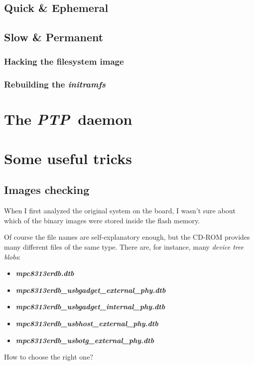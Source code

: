 \documentclass[10pt,a4paper]{article}
\newcommand{\FileName}[1]{\textbf{\textsl{\textsf{{#1}}}}}
\newcommand{\ToolName}[1]{\emph{{#1}}}
\newcommand{\StdName}[1]{\emph{{#1}}}
\newcommand{\InitRamFs}{\ToolName{initramfs}}
\newcommand{\PTP}{\StdName{PTP}}
\begin{document}
        \subsection{ Quick \& Ephemeral }

        \subsection{ Slow \& Permanent }

            \subsubsection{ Hacking the filesystem image }

            \subsubsection{ Rebuilding the \InitRamFs }

    \section{ The \PTP\ daemon }

    \section{ Some useful tricks }

        \subsection{ Images checking }

            When I first analyzed the original system on the board, I
            wasn't sure about which of the binary images were stored
            inside the flash memory.

            Of course the file names are self-explanatory enough, but the
            CD-ROM provides many different files of the same type. There
            are, for instance, many \emph{device tree blobs}:
            \begin{itemize}
                \item \FileName{mpc8313erdb.dtb}
                \item \FileName{mpc8313erdb\_usbgadget\_external\_phy.dtb}
                \item \FileName{mpc8313erdb\_usbgadget\_internal\_phy.dtb}
                \item \FileName{mpc8313erdb\_usbhost\_external\_phy.dtb}
                \item \FileName{mpc8313erdb\_usbotg\_external\_phy.dtb}
            \end{itemize}
            How to choose the right one?
\end{document}
